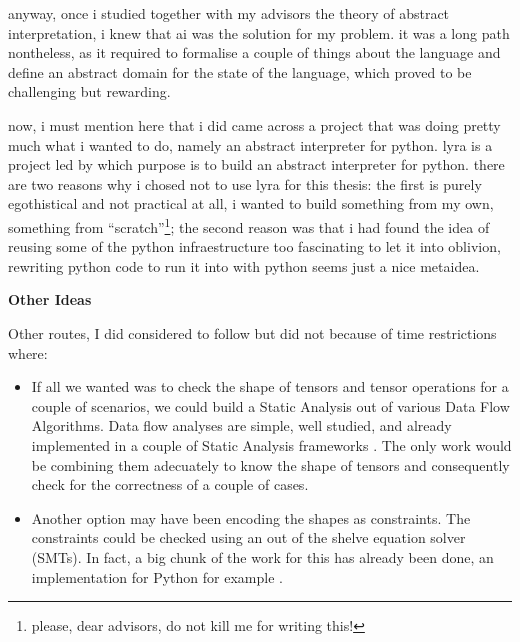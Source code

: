 \documentclass[
11pt, %
english, %
singlespacing, %
headsepline, %
]{MastersDoctoralThesis} %
\providecommand{\tightlist}{%
  \setlength{\itemsep}{0pt}\setlength{\parskip}{0pt}}
\newcommand{\nonsection}[1]{\vspace{3mm}\noindent\textbf{\large #1}\vspace{2mm}}
\begin{document}
anyway, once i studied together with my advisors the theory of abstract
interpretation, i knew that ai was the solution for my problem. it was a
long path nontheless, as it required to formalise a couple of things
about the language and define an abstract domain for the state of the
language, which proved to be challenging but rewarding.

now, i must mention here that i did came across a project that was doing
pretty much what i wanted to do, namely an abstract interpreter for
python. {} lyra is a project led by {} which purpose is to build an abstract interpreter for python. there
are two reasons why i chosed not to use lyra for this thesis: the first
is purely egothistical and not practical at all, i wanted to build
something from my own, something from \enquote{scratch}\footnote{please,
  dear advisors, do not kill me for writing this!}; the second reason
was that i had found the idea of reusing some of the python
infraestructure too fascinating to let it into oblivion, rewriting
python code to run it into with python seems just a nice metaidea.

{\nonsection{Other Ideas}}

Other routes, I did considered to follow but did not because of time
restrictions where:

\begin{itemize}
\tightlist
\item
  If all we wanted was to check the shape of tensors and tensor
  operations for a couple of scenarios, we could build a Static Analysis
  out of various Data Flow Algorithms. Data flow analyses are simple,
  well studied, and already implemented in a couple of Static Analysis
  frameworks {}. The only work would be combining them adecuately to know the
  shape of tensors and consequently check for the correctness of a
  couple of cases.
\item
  Another option may have been encoding the shapes as constraints. The
  constraints could be checked using an out of the shelve equation
  solver (SMTs). In fact, a big chunk of the work for this has already
  been done, an implementation for Python for example {}.
\end{itemize}

\end{document}
